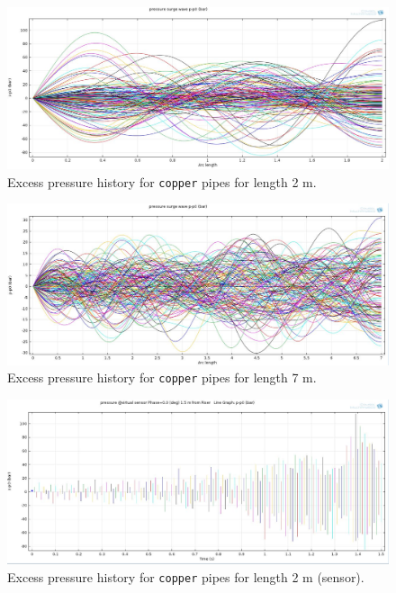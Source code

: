 \begin{figure}[htbp]
\hspace*{-0.1\textwidth}\includegraphics[width=1.2\textwidth]{./water-hammer/copper/CO-2}
\caption{Excess pressure history for \texttt{copper} pipes for length 2 m.}
\label{co1}
\end{figure}

\begin{figure}[htbp]
\hspace*{-0.1\textwidth}\includegraphics[width=1.2\textwidth]{./water-hammer/copper/CO-7}
\caption{Excess pressure history for \texttt{copper} pipes for length 7 m.}
\label{co2}
\end{figure}

\begin{figure}[htbp]
\hspace*{-0.1\textwidth}\includegraphics[width=1.2\textwidth]{./water-hammer/copper/CO-2-sensor}
\caption{Excess pressure history for \texttt{copper} pipes for length 2 m (sensor).}
\label{co3}
\end{figure}

